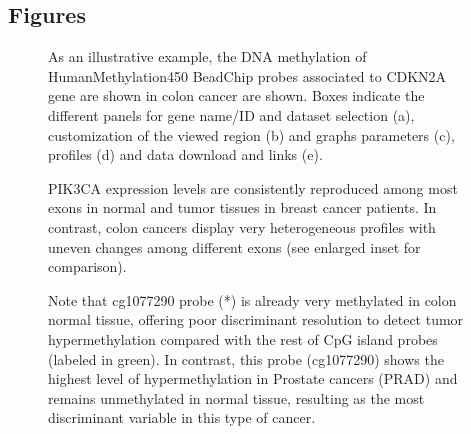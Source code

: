 \documentclass{bmcart}
\begin{document}
\begin{backmatter}
% 





\section*{Figures}

\begin{figure}[h!]
  \caption{
As an illustrative example, the DNA methylation of HumanMethylation450 BeadChip probes associated to CDKN2A gene are shown in colon cancer are shown. Boxes indicate the different panels for gene name/ID and dataset selection (a), customization of the viewed region (b) and graphs parameters (c), profiles (d) and data download and links (e). 
}
  \label{fig:1}
\end{figure}


\begin{figure}[h!]
  \caption{
PIK3CA expression levels are consistently reproduced among most exons in normal and tumor tissues in breast cancer patients. In contrast, colon cancers display very heterogeneous profiles with uneven changes among different exons (see enlarged inset for comparison). 
  }
  \label{fig:2}
\end{figure}


\begin{figure}[h!]
  \caption{
Note that cg1077290 probe (*) is already very methylated in colon normal tissue, offering poor discriminant resolution to detect tumor hypermethylation compared with the rest of CpG island probes (labeled in green). In contrast, this probe (cg1077290) shows the highest level of hypermethylation in Prostate cancers (PRAD) and remains unmethylated in normal tissue, resulting as the most discriminant variable in this type of cancer.  
  }
  \label{fig:3}
\end{figure}


\end{backmatter}
\end{document}
